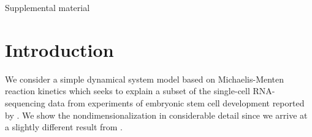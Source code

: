 \documentclass[10pt,letterpaper]{article}
\begin{document}
\vspace*{0.2in}

\begin{center}\begin{LARGE}\begin{bf}
Supplemental material
\end{bf}\end{LARGE}\end{center}








\section{Introduction}

We consider a simple dynamical system model based on Michaelis-Menten reaction kinetics \cite{tu2019single} which seeks to explain a subset of the single-cell RNA-sequencing data from experiments of embryonic stem cell development reported by \cite{chu2016single}. We show the nondimensionalization in considerable detail since we arrive at a slightly different result from \cite{tu2019single}.
\end{document}
